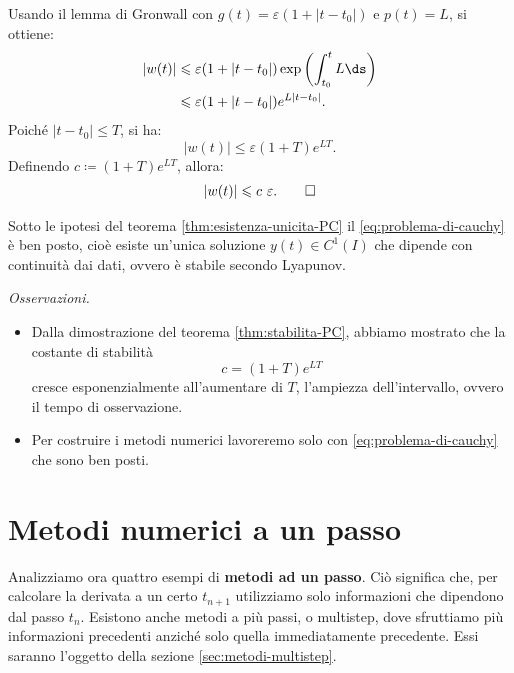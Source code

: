 Usando il lemma di Gronwall con $g(t) =\varepsilon ( 1+| t-t_{0}| )$ e $p(t) =L$, si ottiene:
\begin{align*}
| w(t)|  & \leqslant \varepsilon ( 1+| t-t_{0}| )\exp\left(\int\nolimits ^{t}_{t_{0}} L\ds\right)\\
 & \leqslant \varepsilon ( 1+| t-t_{0}| ) e^{L| t-t_{0}| }.
\end{align*}
Poiché $| t-t_{0}| \leqslant T$, si ha:
\begin{equation*}
| w(t)| \leqslant \varepsilon ( 1+T) e^{LT}.
\end{equation*}
Definendo $c \coloneqq ( 1+T) e^{LT}$, allora:
\begin{gather*}
| w(t)| \leqslant c \ \varepsilon.
\qed
\end{gather*}
\begin{theorem}
Sotto le ipotesi del teorema \ref{thm:esistenza-unicita-PC} il \eqref{eq:problema-di-cauchy} è ben posto, cioè esiste un'unica soluzione $y(t) \in C^{1}(I)$ che dipende con continuità dai dati, ovvero è stabile secondo Lyapunov.
\end{theorem}

\textit{Osservazioni.}
\begin{itemize}
\item Dalla dimostrazione del teorema \ref{thm:stabilita-PC}, abbiamo mostrato che la costante di stabilità
\begin{equation*}
c=( 1+T) e^{LT}
\end{equation*}
cresce esponenzialmente all'aumentare di $T$, l'ampiezza dell'intervallo, ovvero il tempo di osservazione.
\item Per costruire i metodi numerici lavoreremo solo con \eqref{eq:problema-di-cauchy} che sono ben posti.
\end{itemize}
\section{Metodi numerici a un passo}
Analizziamo ora quattro esempi di \textbf{metodi ad un passo}. Ciò significa che, per calcolare la derivata a un certo $t_{n+1}$ utilizziamo solo informazioni che dipendono dal passo $t_{n}$.
Esistono anche metodi a più passi, o multistep, dove sfruttiamo più informazioni precedenti anziché solo quella immediatamente precedente.
Essi saranno l'oggetto della sezione \ref{sec:metodi-multistep}.

